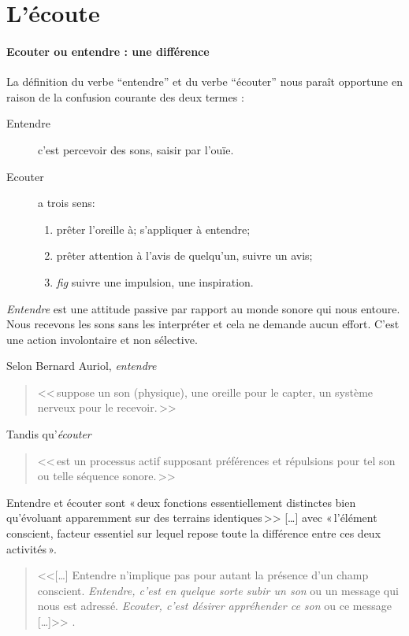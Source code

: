 
\section{L'écoute}


\paragraph{Ecouter ou entendre : une différence}

La définition du verbe ``entendre'' et du verbe ``écouter'' 
\autocite[pp. 361--385]{hachette:dictionnaire} nous paraît opportune
en raison de la confusion courante des deux termes :
\begin{description}
\item[Entendre] c'est  percevoir des sons, saisir par l'ouïe.
\item[Ecouter] a trois sens: 
\begin{enumerate}
	\item prêter l'oreille à; s'appliquer à entendre;
	\item prêter attention à l'avis de quelqu'un, suivre un avis;
	\item \emph{fig} suivre une impulsion,	une inspiration.
\end{enumerate}
\end{description}



\emph{Entendre} est une attitude passive par rapport au monde sonore
qui nous entoure. Nous recevons les sons sans les interpréter et cela
ne demande aucun effort. C'est une action involontaire et non
sélective. 

Selon Bernard Auriol\autocite[p. 2, ch	. 1]{auriol:cle}, \textit{entendre} 
\begin{quote}
	<<\,suppose un son (physique), une oreille
	pour le capter, un système nerveux pour le recevoir.\,>>
\end{quote} 
Tandis qu'\textit{écouter}
\begin{quote}
	<<\,est un
	processus actif supposant préférences et répulsions pour tel son ou
	telle séquence sonore.\,>>
\end{quote}


Entendre et écouter sont «\,deux
fonctions essentiellement distinctes bien qu'évoluant apparemment sur
des terrains identiques\,>>
[\dots] avec «\,l'élément conscient, facteur essentiel sur lequel repose toute la
différence entre ces deux activités\,».\autocite[]{tomatis_oreille_1991}
\begin{quote}
	
	<<[\ldots] Entendre n'implique pas pour autant la pré\-sen\-ce d'un champ
	conscient. \emph{Entendre, c'est en quelque sorte subir
		un son} ou un message qui nous est adressé. \emph{Ecouter, c'est désirer appréhender ce son} ou ce message [\ldots]>>
	\autocite{tomatis:education}.	
\end{quote}



